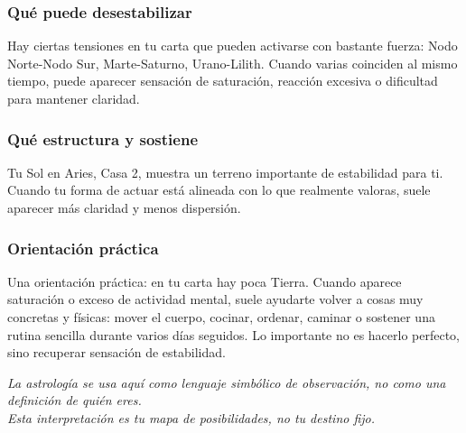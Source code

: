 \documentclass[11pt,a4paper]{article}\usepackage[utf8]{inputenc}
\begin{document}
\subsubsection*{Qué puede desestabilizar}
Hay ciertas tensiones en tu carta que pueden activarse con bastante fuerza: Nodo Norte-Nodo Sur, Marte-Saturno, Urano-Lilith. Cuando varias coinciden al mismo tiempo, puede aparecer sensación de saturación, reacción excesiva o dificultad para mantener claridad.

\subsubsection*{Qué estructura y sostiene}
Tu Sol en Aries, Casa 2, muestra un terreno importante de estabilidad para ti. Cuando tu forma de actuar está alineada con lo que realmente valoras, suele aparecer más claridad y menos dispersión.

\subsubsection*{Orientación práctica}
Una orientación práctica: en tu carta hay poca Tierra. Cuando aparece saturación o exceso de actividad mental, suele ayudarte volver a cosas muy concretas y físicas: mover el cuerpo, cocinar, ordenar, caminar o sostener una rutina sencilla durante varios días seguidos. Lo importante no es hacerlo perfecto, sino recuperar sensación de estabilidad.

\vspace{1cm}
\begin{center}
{\small\itshape\color{grisai}
La astrología se usa aquí como lenguaje simbólico de observación, no como una definición de quién eres.\\
Esta interpretación es tu mapa de posibilidades, no tu destino fijo.
}
\end{center}
\end{document}
